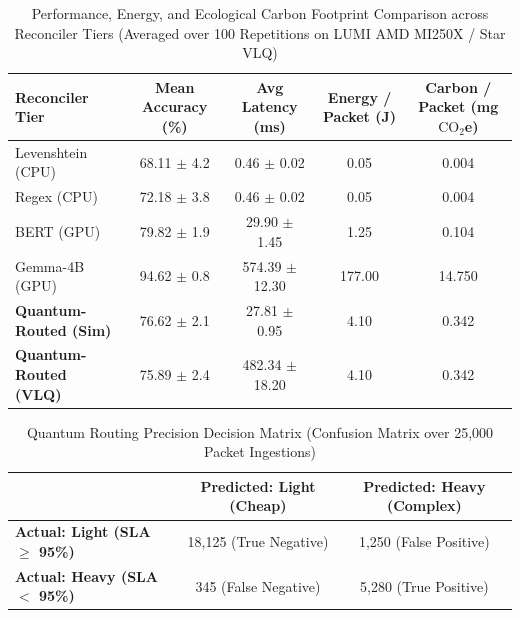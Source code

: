 
\usepackage{booktabs}
\usepackage{siunitx}

\begin{table}[t]
\centering
\caption{Performance, Energy, and Ecological Carbon Footprint Comparison across Reconciler Tiers (Averaged over 100 Repetitions on LUMI AMD MI250X / Star VLQ)}
\label{tab:reconciler_comparison}
\begin{tabular}{l c S[table-format=3.2] S[table-format=4.2] S[table-format=5.2]}
\toprule
\textbf{Reconciler Tier} & \textbf{Mean Accuracy (\%)} & \textbf{Avg Latency (ms)} & \textbf{Energy / Packet (J)} & \textbf{Carbon / Packet (mg $\text{CO}_2$e)} \\
\midrule
Levenshtein (CPU)       & 68.11 $\pm$ 4.2 & 0.46 $\pm$ 0.02   & 0.05    & 0.004 \\
Regex (CPU)             & 72.18 $\pm$ 3.8 & 0.46 $\pm$ 0.02   & 0.05    & 0.004 \\
BERT (GPU)              & 79.82 $\pm$ 1.9 & 29.90 $\pm$ 1.45  & 1.25    & 0.104 \\
Gemma-4B (GPU)          & 94.62 $\pm$ 0.8 & 574.39 $\pm$ 12.30 & 177.00  & 14.750 \\
\midrule
\textbf{Quantum-Routed (Sim)} & 76.62 $\pm$ 2.1 & 27.81 $\pm$ 0.95  & 4.10    & 0.342 \\
\textbf{Quantum-Routed (VLQ)} & 75.89 $\pm$ 2.4 & 482.34 $\pm$ 18.20 & 4.10    & 0.342 \\
\bottomrule
\end{tabular}
\end{table}

\begin{table}[h]
\centering
\caption{Quantum Routing Precision Decision Matrix (Confusion Matrix over 25,000 Packet Ingestions)}
\label{tab:confusion_matrix}
\begin{tabular}{l c c}
\toprule
& \textbf{Predicted: Light (Cheap)} & \textbf{Predicted: Heavy (Complex)} \\
\midrule
\textbf{Actual: Light (SLA $\ge$ 95\%)} & 18,125 (True Negative) & 1,250 (False Positive) \\
\textbf{Actual: Heavy (SLA $<$ 95\%)}  & 345 (False Negative)  & 5,280 (True Positive) \\
\bottomrule
\end{tabular}
\end{table}

